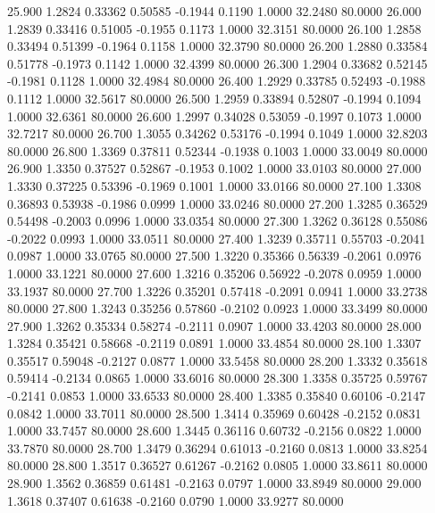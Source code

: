   25.900   1.2824   0.33362   0.50585  -0.1944   0.1190   1.0000  32.2480  80.0000
  26.000   1.2839   0.33416   0.51005  -0.1955   0.1173   1.0000  32.3151  80.0000
  26.100   1.2858   0.33494   0.51399  -0.1964   0.1158   1.0000  32.3790  80.0000
  26.200   1.2880   0.33584   0.51778  -0.1973   0.1142   1.0000  32.4399  80.0000
  26.300   1.2904   0.33682   0.52145  -0.1981   0.1128   1.0000  32.4984  80.0000
  26.400   1.2929   0.33785   0.52493  -0.1988   0.1112   1.0000  32.5617  80.0000
  26.500   1.2959   0.33894   0.52807  -0.1994   0.1094   1.0000  32.6361  80.0000
  26.600   1.2997   0.34028   0.53059  -0.1997   0.1073   1.0000  32.7217  80.0000
  26.700   1.3055   0.34262   0.53176  -0.1994   0.1049   1.0000  32.8203  80.0000
  26.800   1.3369   0.37811   0.52344  -0.1938   0.1003   1.0000  33.0049  80.0000
  26.900   1.3350   0.37527   0.52867  -0.1953   0.1002   1.0000  33.0103  80.0000
  27.000   1.3330   0.37225   0.53396  -0.1969   0.1001   1.0000  33.0166  80.0000
  27.100   1.3308   0.36893   0.53938  -0.1986   0.0999   1.0000  33.0246  80.0000
  27.200   1.3285   0.36529   0.54498  -0.2003   0.0996   1.0000  33.0354  80.0000
  27.300   1.3262   0.36128   0.55086  -0.2022   0.0993   1.0000  33.0511  80.0000
  27.400   1.3239   0.35711   0.55703  -0.2041   0.0987   1.0000  33.0765  80.0000
  27.500   1.3220   0.35366   0.56339  -0.2061   0.0976   1.0000  33.1221  80.0000
  27.600   1.3216   0.35206   0.56922  -0.2078   0.0959   1.0000  33.1937  80.0000
  27.700   1.3226   0.35201   0.57418  -0.2091   0.0941   1.0000  33.2738  80.0000
  27.800   1.3243   0.35256   0.57860  -0.2102   0.0923   1.0000  33.3499  80.0000
  27.900   1.3262   0.35334   0.58274  -0.2111   0.0907   1.0000  33.4203  80.0000
  28.000   1.3284   0.35421   0.58668  -0.2119   0.0891   1.0000  33.4854  80.0000
  28.100   1.3307   0.35517   0.59048  -0.2127   0.0877   1.0000  33.5458  80.0000
  28.200   1.3332   0.35618   0.59414  -0.2134   0.0865   1.0000  33.6016  80.0000
  28.300   1.3358   0.35725   0.59767  -0.2141   0.0853   1.0000  33.6533  80.0000
  28.400   1.3385   0.35840   0.60106  -0.2147   0.0842   1.0000  33.7011  80.0000
  28.500   1.3414   0.35969   0.60428  -0.2152   0.0831   1.0000  33.7457  80.0000
  28.600   1.3445   0.36116   0.60732  -0.2156   0.0822   1.0000  33.7870  80.0000
  28.700   1.3479   0.36294   0.61013  -0.2160   0.0813   1.0000  33.8254  80.0000
  28.800   1.3517   0.36527   0.61267  -0.2162   0.0805   1.0000  33.8611  80.0000
  28.900   1.3562   0.36859   0.61481  -0.2163   0.0797   1.0000  33.8949  80.0000
  29.000   1.3618   0.37407   0.61638  -0.2160   0.0790   1.0000  33.9277  80.0000
